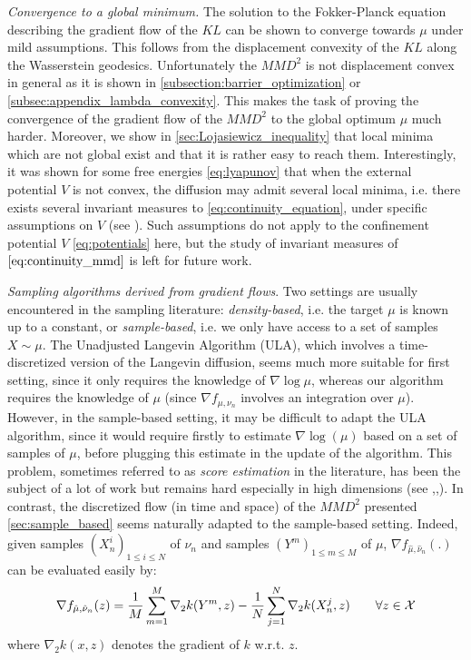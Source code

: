\textit{Convergence to a global minimum.} The solution to the Fokker-Planck equation describing the gradient flow of the $KL$ can be shown to converge towards $\mu$ under mild assumptions. This follows from the displacement convexity of the $KL$ along the Wasserstein geodesics. Unfortunately the $MMD^2$ is not displacement convex in general as it is shown in \cref{subsection:barrier_optimization} or \cref{subsec:appendix_lambda_convexity}. This makes the task of proving the convergence of the gradient flow of the $MMD^2$ to the global optimum $\mu$ much harder. Moreover, we show in \cref{sec:Lojasiewicz_inequality} that local minima which are not global exist and that it is rather easy to reach them. Interestingly, it was shown for some free energies \eqref{eq:lyapunov} that when the external potential $V$ is not convex, the diffusion may admit several local minima, i.e. there exists several invariant measures to \eqref{eq:continuity_equation}, under specific assumptions on $V$ (see \cite{herrmann2010non,tugaut2014phase}). Such assumptions do not apply to the confinement potential $V$ \eqref{eq:potentials} here, but the study of invariant measures of $\eqref{eq:continuity_mmd}$ is left for future work.

\textit{Sampling algorithms derived from gradient flows}. Two settings are usually encountered in the sampling literature: \textit{density-based}, i.e. the target $\mu$ is known up to a constant, or \textit{sample-based}, i.e. we only have access to a set of samples $X \sim \mu$.
	The Unadjusted Langevin Algorithm (ULA), which involves a time-discretized version of the Langevin diffusion, seems much more suitable for first setting, since it only requires the knowledge of $\nabla \log \mu$, whereas our algorithm requires the knowledge of $\mu$ (since $\nabla f_{\mu, \nu_n}$ involves an integration over $\mu$). However, in the sample-based setting, it may be difficult to adapt the ULA algorithm, since it would require firstly to estimate $\nabla \log(\mu)$ based on a set of samples of $\mu$, before plugging this estimate in the update of the algorithm. This problem, sometimes referred to as \textit{score estimation} in the literature, has been the subject of a lot of work but remains hard especially in high dimensions (see \cite{sutherland2017efficient},\cite{li2018gradient},\cite{shi2018spectral}). In contrast, the discretized flow (in time and space) of the $MMD^2$ presented \cref{sec:sample_based} seems naturally adapted to the sample-based setting. Indeed, given samples $(X_{n}^{i})_{1\le i\le N}$ of $\nu_n$ and samples $(Y^m)_{1 \le m \le M}$ of $\mu$, $\nabla f_{\hat{\mu},\hat{\nu}_n}(.)$ can be evaluated easily by:
	\begin{align}
		 \nabla f_{\hat{\mu},\hat{\nu}_n}(z) = \frac{1}{M}\sum\limits_{m=1}^M \nabla_2 k(Y^m,z)-\frac{1}{N}\sum\limits_{j=1}^N \nabla_2 k(X_n^j,z) \qquad \forall z\in{{\mathcal X}}
	\end{align}
	where $\nabla_2 k(x,z)$ denotes the gradient of $k$ w.r.t. $z$. 




